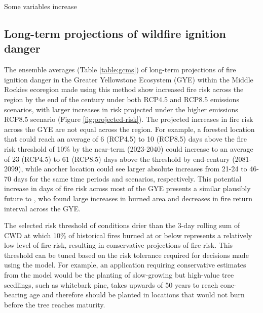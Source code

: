 \documentclass[11pt]{article}
\begin{document}
Some variables increase


\subsection{Long-term projections of wildfire ignition danger}

The ensemble averages (Table \ref{table:gcms}) of long-term projections of fire ignition danger in the Greater Yellowstone Ecosystem (GYE) within the Middle Rockies ecoregion made using this method show increased fire risk across the region by the end of the century under both RCP4.5 and RCP8.5 emissions scenarios, with larger increases in risk projected under the higher emissions RCP8.5 scenario (Figure \ref{fig:projected-risk}). The projected increases in fire risk across the GYE are not equal across the region.  For example, a forested location that could reach an average of 6 (RCP4.5) to 10 (RCP8.5) days above the fire risk threshold of 10\% by the near-term (2023-2040) could increase to an average of 23 (RCP4.5) to 61 (RCP8.5) days above the threshold by end-century (2081-2099), while another location could see larger absolute increases from 21-24 to 46-70 days for the same time periods and scenarios, respectively.  This potential increase in days of fire risk across most of the GYE presents a similar plausibly future to \citet{westerlingContinuedWarmingCould2011}, who found large increases in burned area and decreases in fire return interval across the GYE.  

The selected risk threshold of conditions drier than the 3-day rolling sum of CWD at which 10\% of historical fires burned at or below represents a relatively low level of fire risk, resulting in conservative projections of fire risk.  This threshold can be tuned based on the risk tolerance required for decisions made using the model.  For example, an application requiring conservative estimates from the model would be the planting of slow-growing but high-value tree seedlings, such as whitebark pine, takes upwards of 50 years to reach cone-bearing age and therefore should be planted in locations that would not burn before the tree reaches maturity.

\end{document}
